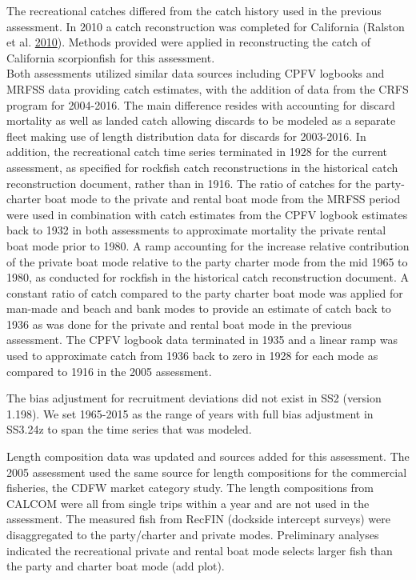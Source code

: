 \documentclass[12pt,]{article}
\begin{document}
The recreational catches differed from the catch history used in the
previous assessment. In 2010 a catch reconstruction was completed for
California (Ralston et al. \protect\hyperlink{ref-Ralston2010}{2010}).
Methods provided were applied in reconstructing the catch of California
scorpionfish for this assessment.\\
Both assessments utilized similar data sources including CPFV logbooks
and MRFSS data providing catch estimates, with the addition of data from
the CRFS program for 2004-2016. The main difference resides with
accounting for discard mortality as well as landed catch allowing
discards to be modeled as a separate fleet making use of length
distribution data for discards for 2003-2016. In addition, the
recreational catch time series terminated in 1928 for the current
assessment, as specified for rockfish catch reconstructions in the
historical catch reconstruction document, rather than in 1916. The ratio
of catches for the party-charter boat mode to the private and rental
boat mode from the MRFSS period were used in combination with catch
estimates from the CPFV logbook estimates back to 1932 in both
assessments to approximate mortality the private rental boat mode prior
to 1980. A ramp accounting for the increase relative contribution of the
private boat mode relative to the party charter mode from the mid 1965
to 1980, as conducted for rockfish in the historical catch
reconstruction document. A constant ratio of catch compared to the party
charter boat mode was applied for man-made and beach and bank modes to
provide an estimate of catch back to 1936 as was done for the private
and rental boat mode in the previous assessment. The CPFV logbook data
terminated in 1935 and a linear ramp was used to approximate catch from
1936 back to zero in 1928 for each mode as compared to 1916 in the 2005
assessment.

The bias adjustment for recruitment deviations did not exist in SS2
(version 1.198). We set 1965-2015 as the range of years with full bias
adjustment in SS3.24z to span the time series that was modeled.

Length composition data was updated and sources added for this
assessment. The 2005 assessment used the same source for length
compositions for the commercial fisheries, the CDFW market category
study. The length compositions from CALCOM were all from single trips
within a year and are not used in the assessment. The measured fish from
RecFIN (dockside intercept surveys) were disaggregated to the
party/charter and private modes. Preliminary analyses indicated the
recreational private and rental boat mode selects larger fish than the
party and charter boat mode (add plot).
\end{document}
